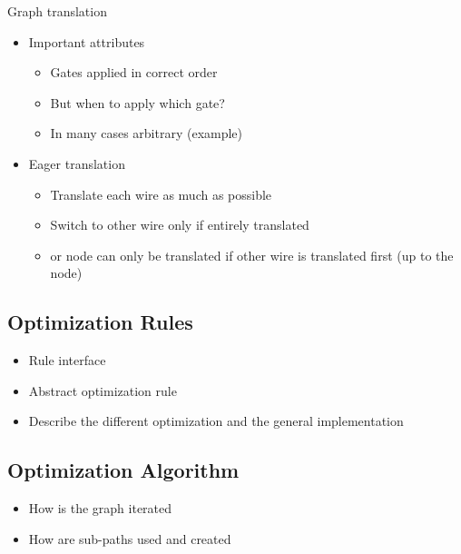 Graph translation
\begin{itemize}
    \item Important attributes
    \begin{itemize}
        \item Gates applied in correct order
        \item But when to apply which gate?
        \item In many cases arbitrary (example) 
    \end{itemize}
    \item Eager translation
    \begin{itemize}
        \item Translate each wire as much as possible
        \item Switch to other wire only if entirely translated 
        \item or node can only be translated if other wire is translated first (up to the node) 
    \end{itemize}
\end{itemize} 

\subsection{Optimization Rules}
\begin{itemize}
    \item Rule interface
    \item Abstract optimization rule
    \item Describe the different optimization and the general implementation
\end{itemize}

\subsection{Optimization Algorithm}
\begin{itemize}
    \item How is the graph iterated\
    \item How are sub-paths used and created
\end{itemize}
